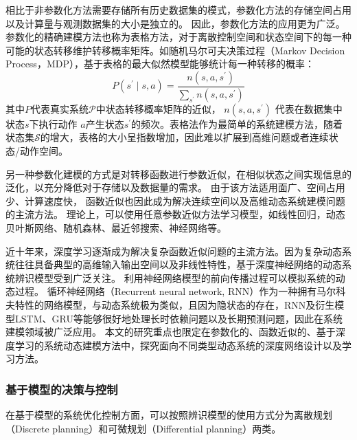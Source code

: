 相比于非参数化方法需要存储所有历史数据集的模式，参数化方法的存储空间占用以及计算量与观测数据集的大小是独立的。
因此，参数化方法的应用更为广泛。
参数化的精确建模方法也称为表格方法，对于离散控制空间和状态空间下的每一种可能的状态转移维护转移概率矩阵。如随机马尔可夫决策过程（Markov Decision Process，MDP），基于表格的最大似然模型能够统计每一种转移的概率：
\begin{equation}
    P\left(s^{\prime} \mid s, a\right)=\frac{n\left(s, a, s^{\prime}\right)}{\sum_{s^{\prime}} n\left(s, a, s^{\prime}\right)}
\end{equation}
其中$P$代表真实系统$\mathcal{\mathcal { P }}$中状态转移概率矩阵的近似，
$n\left(s, a, s^{\prime}\right)$ 代表在数据集中状态$s$下执行动作 $a$产生状态$s^{\prime}$的频次。表格法作为最简单的系统建模方法，随着状态集$\mathcal{S}$的增大，表格的大小呈指数增加，因此难以扩展到高维问题或者连续状态/动作空间。

另一种参数化建模的方式是对转移函数进行参数近似，在相似状态之间实现信息的泛化，以充分降低对于存储以及数据量的需求。
由于该方法适用面广、空间占用少、计算速度快，
函数近似也因此成为解决连续空间以及高维动态系统建模问题的主流方法。
理论上，可以使用任意参数近似方法学习模型，如线性回归\cite{silver2008sample}，动态贝叶斯网络、随机森林、最近邻搜索、神经网络\cite{werbos1989neural}等。

近十年来，深度学习逐渐成为解决复杂函数近似问题的主流方法。因为复杂动态系统往往具备典型的高维输入输出空间以及非线性特性，基于深度神经网络的动态系统辨识模型受到广泛关注。
利用神经网络模型的前向传播过程可以模拟系统的动态过程\cite{temeng1995model, tan1996nonlinear}。
循环神经网络（Recurrent neural network, RNN）作为一种拥有马尔科夫特性的网络模型，与动态系统极为类似，且因为隐状态的存在，RNN及衍生模型LSTM、GRU等能够很好地处理长时依赖问题以及长期预测问题，因此在系统建模领域被广泛应用\cite{delgado1995dynamic, zamarreno1998state}。
本文的研究重点也限定在参数化的、函数近似的、基于深度学习的系统动态建模方法中，探究面向不同类型动态系统的深度网络设计以及学习方法。

\subsubsection{基于模型的决策与控制}
在基于模型的系统优化控制方面，可以按照辨识模型的使用方式分为离散规划（Discrete planning）和可微规划（Differential planning）两类。

